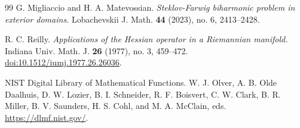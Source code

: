 \documentclass[11pt]{amsart}
\theoremstyle{definition}
\numberwithin{equation}{section}
\begin{document}
\begin{thebibliography}{99}
G. Migliaccio and H. A. Matevossian.
\emph{Steklov-Farwig biharmonic problem in exterior domains.}
Lobachevskii J. Math. \textbf{44} (2023), no. 6, 2413--2428.

R. C. Reilly.
\emph{Applications of the Hessian operator in a Riemannian manifold.}
Indiana Univ. Math. J. \textbf{26} (1977), no. 3, 459--472.
\href{https://doi.org/10.1512/iumj.1977.26.26036}{doi:10.1512/iumj.1977.26.26036}.

NIST Digital Library of Mathematical Functions.
W. J. Olver, A. B. Olde Daalhuis, D. W. Lozier, B. I. Schneider, R. F. Boisvert, C. W. Clark, B. R. Miller, B. V. Saunders, H. S. Cohl, and M. A. McClain, eds.
\url{https://dlmf.nist.gov/}.

\end{thebibliography}
\end{document}
